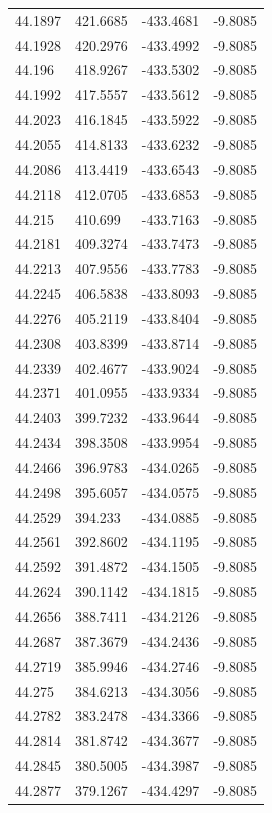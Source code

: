 \begin{table}[H]
\begin{tabular}{llll}
44.1897 & 421.6685 & -433.4681 & -9.8085 \\
44.1928 & 420.2976 & -433.4992 & -9.8085 \\
44.196 & 418.9267 & -433.5302 & -9.8085 \\
44.1992 & 417.5557 & -433.5612 & -9.8085 \\
44.2023 & 416.1845 & -433.5922 & -9.8085 \\
44.2055 & 414.8133 & -433.6232 & -9.8085 \\
44.2086 & 413.4419 & -433.6543 & -9.8085 \\
44.2118 & 412.0705 & -433.6853 & -9.8085 \\
44.215 & 410.699 & -433.7163 & -9.8085 \\
44.2181 & 409.3274 & -433.7473 & -9.8085 \\
44.2213 & 407.9556 & -433.7783 & -9.8085 \\
44.2245 & 406.5838 & -433.8093 & -9.8085 \\
44.2276 & 405.2119 & -433.8404 & -9.8085 \\
44.2308 & 403.8399 & -433.8714 & -9.8085 \\
44.2339 & 402.4677 & -433.9024 & -9.8085 \\
44.2371 & 401.0955 & -433.9334 & -9.8085 \\
44.2403 & 399.7232 & -433.9644 & -9.8085 \\
44.2434 & 398.3508 & -433.9954 & -9.8085 \\
44.2466 & 396.9783 & -434.0265 & -9.8085 \\
44.2498 & 395.6057 & -434.0575 & -9.8085 \\
44.2529 & 394.233 & -434.0885 & -9.8085 \\
44.2561 & 392.8602 & -434.1195 & -9.8085 \\
44.2592 & 391.4872 & -434.1505 & -9.8085 \\
44.2624 & 390.1142 & -434.1815 & -9.8085 \\
44.2656 & 388.7411 & -434.2126 & -9.8085 \\
44.2687 & 387.3679 & -434.2436 & -9.8085 \\
44.2719 & 385.9946 & -434.2746 & -9.8085 \\
44.275 & 384.6213 & -434.3056 & -9.8085 \\
44.2782 & 383.2478 & -434.3366 & -9.8085 \\
44.2814 & 381.8742 & -434.3677 & -9.8085 \\
44.2845 & 380.5005 & -434.3987 & -9.8085 \\
44.2877 & 379.1267 & -434.4297 & -9.8085 \\

\end{tabular}
\end{table}
